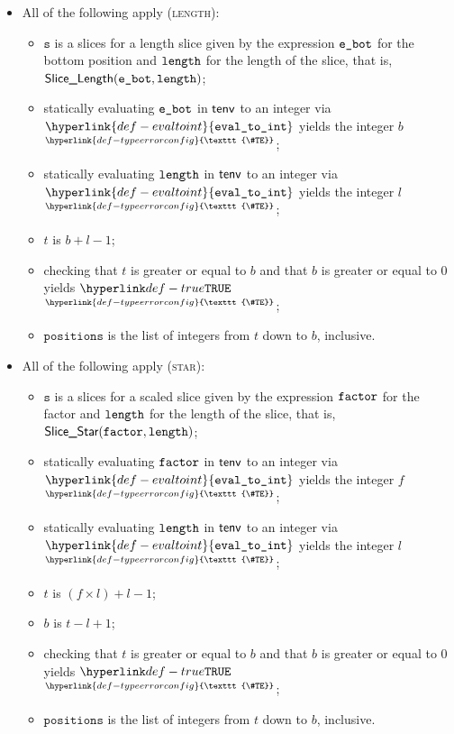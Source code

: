 \documentclass{book}
\newcommand\TypeErrorConfig[0]{\hyperlink{def-typeerrorconfig}{\texttt{\#TE}}}
\newcommand\ProseOrTypeError[0]{\hyperlink{def-proseortypeerror}{$^{\TypeErrorConfig}$}}
\newcommand\evaltoint[0]{\hyperlink{def-evaltoint}{\texttt{eval\_to\_int}}}
\newcommand\vs[0]{\texttt{s}}
\newcommand\positions[0]{\texttt{positions}}
\begin{document}
\begin{itemize}
  \item All of the following apply (\textsc{length}):
  \begin{itemize}
    \item $\vs$ is a slices for a length slice given by the expression $\texttt{e\_bot}$
          for the bottom position and $\texttt{length}$ for the length of the slice, that is, \\ $\textsf{Slice\_Length}(\texttt{e\_bot}, \texttt{length})$;
    \item statically evaluating $\texttt{e\_bot}$ in $\textsf{tenv}$ to an integer via $\evaltoint$ yields the integer $b$ \ProseOrTypeError;
    \item statically evaluating $\texttt{length}$ in $\textsf{tenv}$ to an integer via $\evaltoint$ yields the integer $l$ \ProseOrTypeError;
    \item $t$ is $b + l - 1$;
    \item checking that $t$ is greater or equal to $b$ and that $b$ is greater or equal to $0$ yields $\True$ \ProseOrTypeError;
    \item $\positions$ is the list of integers from $t$ down to $b$, inclusive.
  \end{itemize}

  \item All of the following apply (\textsc{star}):
  \begin{itemize}
    \item $\vs$ is a slices for a scaled slice given by the expression $\texttt{factor}$
          for the factor and $\texttt{length}$ for the length of the slice, that is, \\ $\textsf{Slice\_Star}(\texttt{factor}, \texttt{length})$;
    \item statically evaluating $\texttt{factor}$ in $\textsf{tenv}$ to an integer via $\evaltoint$ yields the integer $f$ \ProseOrTypeError;
    \item statically evaluating $\texttt{length}$ in $\textsf{tenv}$ to an integer via $\evaltoint$ yields the integer $l$ \ProseOrTypeError;
    \item $t$ is $(f \times l) + l - 1$;
    \item $b$ is $t - l + 1$;
    \item checking that $t$ is greater or equal to $b$ and that $b$ is greater or equal to $0$ yields $\True$ \ProseOrTypeError;
    \item $\positions$ is the list of integers from $t$ down to $b$, inclusive.
  \end{itemize}
\end{itemize}
\end{document}
